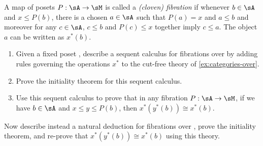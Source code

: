\begin{ex}\label{ex:seqcalc-poset-fib}
  A map of posets $P:\sA\to\sM$ is called a \emph{(cloven) fibration} if whenever $b\in\sA$ and $x\le P(b)$, there is a chosen $a\in \sA$ such that $P(a)=x$ and $a\le b$ and moreover for any $c\in\sA$, $c\le b$ and $P(c)\le x$ together imply $c\le a$.
  The object $a$ can be written as $x^*(b)$.
  \begin{enumerate}
  \item Given a fixed poset \sM, describe a sequent calculus for fibrations over \sM by adding rules governing the operations $x^*$ to the cut-free theory of \cref{ex:categories-over}.
  \item Prove the initiality theorem for this sequent calculus.
  \item Use this sequent calculus to prove that in any fibration $P:\sA\to\sM$, if we have $b\in \sA$ and $x\le y\le P(b)$, then $x^*(y^*(b))\cong x^*(b)$.
  \end{enumerate}
\end{ex}

\begin{ex}\label{ex:natded-poset-fib}
  Now describe instead a natural deduction for fibrations over \sM, prove the initiality theorem, and re-prove that $x^*(y^*(b))\cong x^*(b)$ using this theory.
\end{ex}

